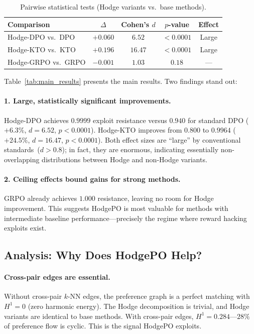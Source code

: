\documentclass{article}
\begin{document}
\begin{table}[t]
\centering
\caption{Pairwise statistical tests (Hodge variants vs.\ base methods).}
\label{tab:pairwise}
\vskip 0.1in
\begin{tabular}{@{}lcccc@{}}
\toprule
\textbf{Comparison} & \textbf{$\Delta$} & \textbf{Cohen's $d$} & \textbf{$p$-value} & \textbf{Effect} \\
\midrule
Hodge-DPO vs.\ DPO & $+0.060$ & $6.52$ & $< 0.0001$ & Large \\
Hodge-KTO vs.\ KTO & $+0.196$ & $16.47$ & $< 0.0001$ & Large \\
Hodge-GRPO vs.\ GRPO & $-0.001$ & $1.03$ & $0.18$ & --- \\
\bottomrule
\end{tabular}
\end{table}

Table~\ref{tab:main_results} presents the main results. Two findings stand out:

\paragraph{1. Large, statistically significant improvements.} Hodge-DPO achieves $0.9999$ exploit resistance versus $0.940$ for standard DPO ($+6.3\%$, $d = 6.52$, $p < 0.0001$). Hodge-KTO improves from $0.800$ to $0.9964$ ($+24.5\%$, $d = 16.47$, $p < 0.0001$). Both effect sizes are ``large'' by conventional standards~($d > 0.8$); in fact, they are enormous, indicating essentially non-overlapping distributions between Hodge and non-Hodge variants.

\paragraph{2. Ceiling effects bound gains for strong methods.} GRPO already achieves $1.000$ resistance, leaving no room for Hodge improvement. This suggests HodgePO is most valuable for methods with intermediate baseline performance---precisely the regime where reward hacking exploits exist.

\subsection{Analysis: Why Does HodgePO Help?}

\paragraph{Cross-pair edges are essential.} Without cross-pair $k$-NN edges, the preference graph is a perfect matching with $H^1 = 0$ (zero harmonic energy). The Hodge decomposition is trivial, and Hodge variants are identical to base methods. With cross-pair edges, $H^1 = 0.284$---$28\%$ of preference flow is cyclic. This is the signal HodgePO exploits.
\end{document}
